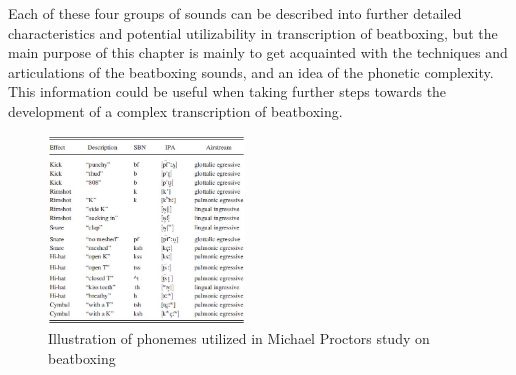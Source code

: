Each of these four groups of sounds can be described into further detailed characteristics and potential utilizability in transcription of beatboxing, but the main purpose of this chapter is mainly to get acquainted with the techniques and articulations of the beatboxing sounds, and an idea of the phonetic complexity. This information could be useful when taking further steps towards the development of a complex transcription of beatboxing.
\begin{figure}[h]
	\begin{center}
		\includegraphics[height=5cm]{fig/phonemes.JPG}
		\caption{Illustration of phonemes utilized in Michael Proctors study on beatboxing \citep{proctor2012}}
		\label{VoiceBand}
	\end{center}
\end{figure}
